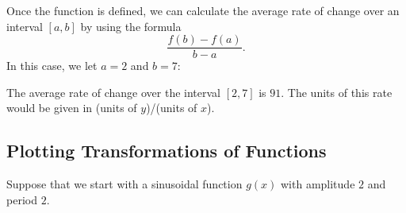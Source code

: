 \begin{maplegroup}
\begin{mapleinput}
\end{mapleinput}
\mapleresult
\begin{maplelatex}
\end{maplelatex}
\end{maplegroup}

Once the function is defined, we can calculate the average rate of change over an interval $[a,b]$ by using the formula \[ \frac{f(b)-f(a)}{b-a}. \] 
In this case, we let $a=2$ and $b=7$:

\begin{maplegroup}
\begin{mapleinput}
\end{mapleinput}
\mapleresult
\begin{maplelatex}
\end{maplelatex}
\end{maplegroup}
\begin{maplegroup}
\begin{mapleinput}
\end{mapleinput}
\end{maplegroup}

\noindent
The average rate of change over the interval $[2,7]$ is $91$. The units of this rate would be given in (units of $y$)/(units of $x$).

\subsection{Plotting Transformations of Functions}
\label{subsec:plotting_transformations}

Suppose that we start with a sinusoidal function $g(x)$ with amplitude $2$ and period $2$.

\begin{maplegroup}
\begin{mapleinput}
\end{mapleinput}
\end{maplegroup}

